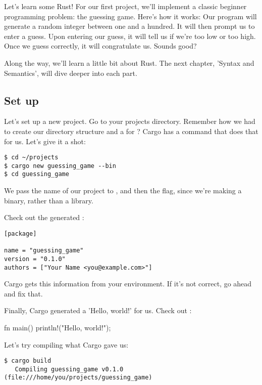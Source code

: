 Let's learn some Rust! For our first project, we'll implement a classic beginner programming problem: the guessing game. 
Here's how it works: Our program will generate a random integer between one and a hundred. It will then prompt us to enter 
a guess. Upon entering our guess, it will tell us if we're too low or too high. Once we guess correctly, it will congratulate 
us. Sounds good?

\blank

Along the way, we'll learn a little bit about Rust. The next chapter, 'Syntax and Semantics', will dive deeper into each part.

\subsection{Set up}

Let's set up a new project. Go to your projects directory. Remember how we had to create our directory structure and a 
 for ? Cargo has a command that does that for us. Let's give it a shot:

\begin{verbatim}
$ cd ~/projects
$ cargo new guessing_game --bin
$ cd guessing_game
\end{verbatim}

We pass the name of our project to , and then the  flag, since we're making a binary, rather than 
a library.

\blank

Check out the generated :

\begin{verbatim}
[package]

name = "guessing_game"
version = "0.1.0"
authors = ["Your Name <you@example.com>"]
\end{verbatim}

Cargo gets this information from your environment. If it's not correct, go ahead and fix that.

\blank

Finally, Cargo generated a 'Hello, world!' for us. Check out :

\begin{rustc}
fn main() {
    println!("Hello, world!");
}
\end{rustc}

Let's try compiling what Cargo gave us:

\begin{verbatim}
$ cargo build
   Compiling guessing_game v0.1.0 (file:///home/you/projects/guessing_game)  
\end{verbatim}

